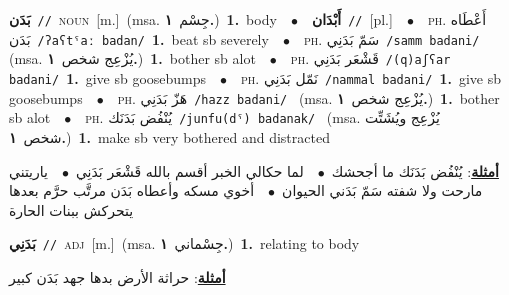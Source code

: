 \documentclass[10pt,a4paper,twoside]{article} %
\begin{document}
\begin{multicols}{2}
{\setlength\topsep{0pt}\textbf{\foreignlanguage{arabic}{بَدَن}}\ {\color{gray}\texttt{//}\color{black}}\ \textsc{noun}\ [m.]\ \color{gray}(msa. \foreignlanguage{arabic}{جِسْم}~\foreignlanguage{arabic}{\textbf{١.}})\color{black}\ \textbf{1.}~body\ \ $\bullet$\ \ \setlength\topsep{0pt}\textbf{\foreignlanguage{arabic}{أَبْدَان}}\ {\color{gray}\texttt{//}\color{black}}\ [pl.]\ \ $\bullet$\ \ \textsc{ph.} \color{gray} \foreignlanguage{arabic}{أَعْطَاه بَدَن}\color{black}\ {\color{gray}\texttt{/{\sffamily ʔaʕtˤaː badan}/}\color{black}}\ \textbf{1.}~beat sb severely\ \ $\bullet$\ \ \textsc{ph.} \color{gray} \foreignlanguage{arabic}{سَمّ بَدَنِي}\color{black}\ {\color{gray}\texttt{/{\sffamily samm badani}/}\color{black}}\ \color{gray} (msa. \foreignlanguage{arabic}{يُزْعِج شخص}~\foreignlanguage{arabic}{\textbf{١.}})\color{black}\ \textbf{1.}~bother sb alot\ \ $\bullet$\ \ \textsc{ph.} \color{gray} \foreignlanguage{arabic}{قَشْعَر بَدَنِي}\color{black}\ {\color{gray}\texttt{/{\sffamily (q)aʃʕar badani}/}\color{black}}\ \textbf{1.}~give sb goosebumps\ \ $\bullet$\ \ \textsc{ph.} \color{gray} \foreignlanguage{arabic}{نَمّل بَدَنِي}\color{black}\ {\color{gray}\texttt{/{\sffamily nammal badani}/}\color{black}}\ \textbf{1.}~give sb goosebumps\ \ $\bullet$\ \ \textsc{ph.} \color{gray} \foreignlanguage{arabic}{هَزّ بَدَنِي}\color{black}\ {\color{gray}\texttt{/{\sffamily hazz badani}/}\color{black}}\ \color{gray} (msa. \foreignlanguage{arabic}{يُزْعِج شخص}~\foreignlanguage{arabic}{\textbf{١.}})\color{black}\ \textbf{1.}~bother sb alot\ \ $\bullet$\ \ \textsc{ph.} \color{gray} \foreignlanguage{arabic}{يُنْفُض بَدَنَك}\color{black}\ {\color{gray}\texttt{/{\sffamily junfu(dˤ) badanak}/}\color{black}}\ \color{gray} (msa. \foreignlanguage{arabic}{يُزْعِج ويُشَتِّت شخص}~\foreignlanguage{arabic}{\textbf{١.}})\color{black}\ \textbf{1.}~make sb very bothered and distracted\  \begin{flushright}\color{gray}\foreignlanguage{arabic}{\textbf{\underline{\foreignlanguage{arabic}{أمثلة}}}: يُنْفُض بَدَنَك ما أجحشك\ $\bullet$\ \  لما حكالي الخبر أقسم بالله قَشْعَر بَدَنِي\ $\bullet$\ \  ياريتني مارحت ولا شفته سَمّ بَدَني الحيوان\ $\bullet$\ \  أخوي مسكه وأعطاه بَدَن مرتَّب حرَّم بعدها يتحركش ببنات الحارة}\end{flushright}\color{black}} \vspace{2mm}

{\setlength\topsep{0pt}\textbf{\foreignlanguage{arabic}{بَدَنِي}}\ {\color{gray}\texttt{//}\color{black}}\ \textsc{adj}\ [m.]\ \color{gray}(msa. \foreignlanguage{arabic}{جِسْماني}~\foreignlanguage{arabic}{\textbf{١.}})\color{black}\ \textbf{1.}~relating to body\  \begin{flushright}\color{gray}\foreignlanguage{arabic}{\textbf{\underline{\foreignlanguage{arabic}{أمثلة}}}: حراثة الأرض بدها جهد بَدَن كبير}\end{flushright}\color{black}} \vspace{2mm}


\end{multicols}
\end{document}

